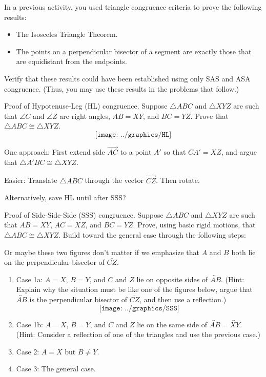 \begin{prob}
In a previous activity, you used triangle congruence criteria to prove the following results: 
\begin{itemize}
\item The Isosceles Triangle Theorem.
\item The points on a perpendicular bisector of a segment are exactly those that are equidistant from the endpoints.
\end{itemize}
Verify that these results could have been established using only SAS and ASA congruence.  (Thus, you may use these results in the problems that follow.) 
\end{prob}

\begin{prob}
Proof of Hypotenuse-Leg (HL) congruence.  Suppose $\triangle ABC$ and $\triangle XYZ$ are such that $\angle C$ and $\angle Z$ are right angles, $AB=XY$, and $BC=YZ$.  Prove that $\triangle ABC \cong \triangle XYZ$.  
$$\texttt{[image: ../graphics/HL]}$$
\end{prob}

\begin{teachingnote}
One approach:  First extend side $\overrightarrow{AC}$ to a point $A'$ so that $CA'=XZ$, and argue that $\triangle A'BC \cong \triangle XYZ$.

Easier:  Translate $\triangle ABC$ through the vector $\overrightarrow{CZ}$.  Then rotate.

Alternatively, save HL until after SSS?
\end{teachingnote}


\begin{prob}
Proof of Side-Side-Side (SSS) congruence.  Suppose $\triangle ABC$ and $\triangle XYZ$ are such that $AB=XY$, $AC=XZ$, and $BC=YZ$.  Prove, using basic rigid motions, that $\triangle ABC \cong \triangle XYZ$.  Build toward the general case through the following steps:  
\begin{teachingnote}
Or maybe these two figures don't matter if we emphasize that $A$ and $B$ both lie on the perpendicular bisector of $\overline{CZ}$.
\end{teachingnote}
\begin{enumerate}
\item Case 1a:  $A=X$, $B=Y$, and $C$ and $Z$ lie on opposite sides of $\overleftrightarrow{AB}$.  (Hint:  Explain why the situation must be like one of the figures below, argue that $\overleftrightarrow{AB}$ is the perpendicular bisector of $\overline{CZ}$, and then use a reflection.)
$$\texttt{[image: ../graphics/SSS]}$$
\item Case 1b:  $A=X$, $B=Y$, and $C$ and $Z$ lie on the same side of $\overleftrightarrow{AB}=\overleftrightarrow{XY}$.  (Hint: Consider a reflection of one of the triangles and use the previous case.)  
\item Case 2:  $A=X$ but $B \ne Y$.
\item Case 3: The general case.  
\end{enumerate}
\end{prob}



